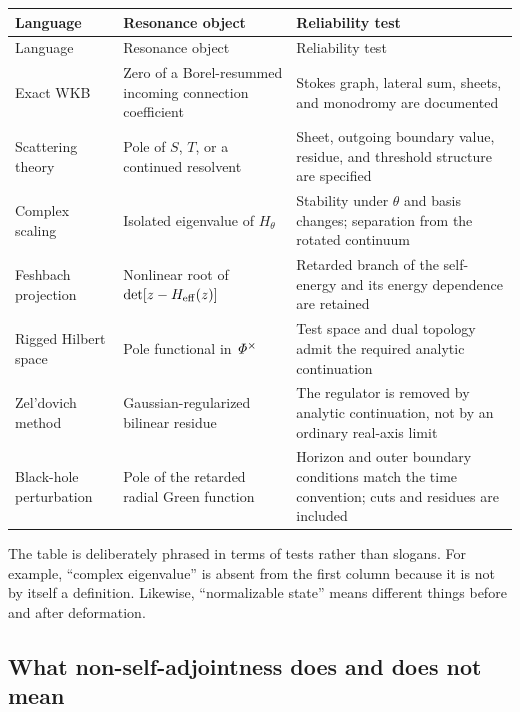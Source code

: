 \begin{longtable}{>{\raggedright\arraybackslash}p{}
                  >{\raggedright\arraybackslash}p{}
                  >{\raggedright\arraybackslash}p{}}
\toprule
Language & Resonance object & Reliability test \\
\midrule
\endfirsthead
\toprule
Language & Resonance object & Reliability test \\
\midrule
\endhead
Exact WKB & Zero of a Borel-resummed incoming connection coefficient & Stokes
graph, lateral sum, sheets, and monodromy are documented \\
\addlinespace
Scattering theory & Pole of $S$, $T$, or a continued resolvent & Sheet,
outgoing boundary value, residue, and threshold structure are specified \\
\addlinespace
Complex scaling & Isolated eigenvalue of $H_\theta$ & Stability under
$\theta$ and basis changes; separation from the rotated continuum \\
\addlinespace
Feshbach projection & Nonlinear root of
$\det[z-H_{\mathrm{eff}}(z)]$ & Retarded branch of the self-energy and its
energy dependence are retained \\
\addlinespace
Rigged Hilbert space & Pole functional in $\mathit{\Phi}^\times$ & Test space and
dual topology admit the required analytic continuation \\
\addlinespace
Zel'dovich method & Gaussian-regularized bilinear residue & The regulator is
removed by analytic continuation, not by an ordinary real-axis limit \\
\addlinespace
Black-hole perturbation & Pole of the retarded radial Green function & Horizon
and outer boundary conditions match the time convention; cuts and residues
are included \\
\bottomrule
\end{longtable}

The table is deliberately phrased in terms of tests rather than slogans.  For
example, ``complex eigenvalue'' is absent from the first column because it is
not by itself a definition.  Likewise, ``normalizable state'' means different
things before and after deformation.

\subsection{What non-self-adjointness does and does not mean}
\label{subsec:meaning-nonselfadjoint}

